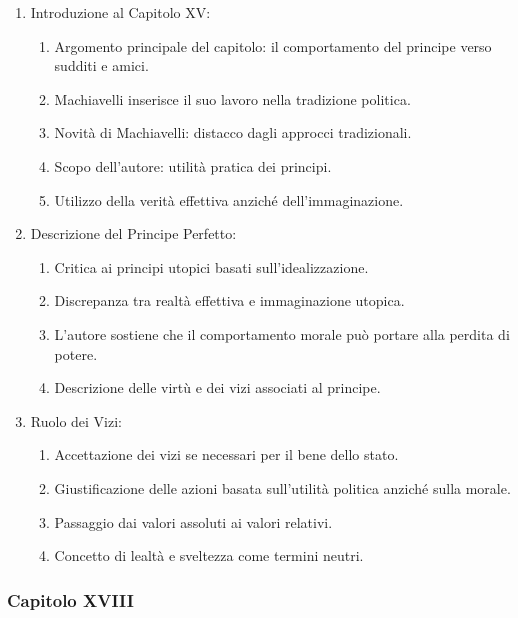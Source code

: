 \documentclass{article}
\begin{document}
\begin{enumerate}[label*=\arabic*.]
    \item Introduzione al Capitolo XV:
    \begin{enumerate}[label*=\alph*.]
        \item Argomento principale del capitolo: il comportamento del principe verso sudditi e amici.
        \item Machiavelli inserisce il suo lavoro nella tradizione politica.
        \item Novità di Machiavelli: distacco dagli approcci tradizionali.
        \item Scopo dell'autore: utilità pratica dei principi.
        \item Utilizzo della verità effettiva anziché dell'immaginazione.
    \end{enumerate}
    
    \item Descrizione del Principe Perfetto:
    \begin{enumerate}[label*=\alph*.]
        \item Critica ai principi utopici basati sull'idealizzazione.
        \item Discrepanza tra realtà effettiva e immaginazione utopica.
        \item L'autore sostiene che il comportamento morale può portare alla perdita di potere.
        \item Descrizione delle virtù e dei vizi associati al principe.
    \end{enumerate}
    
    \item Ruolo dei Vizi:
    \begin{enumerate}[label*=\alph*.]
        \item Accettazione dei vizi se necessari per il bene dello stato.
        \item Giustificazione delle azioni basata sull'utilità politica anziché sulla morale.
        \item Passaggio dai valori assoluti ai valori relativi.
        \item Concetto di lealtà e sveltezza come termini neutri.
    \end{enumerate}
\end{enumerate}

\newpage
\subsubsection{Capitolo XVIII}
\end{document}
